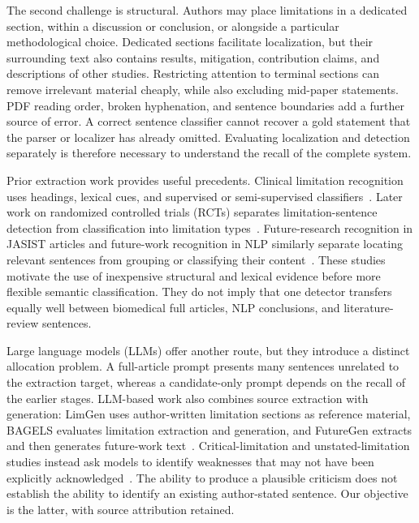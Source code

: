 The second challenge is structural. Authors may place limitations in a dedicated section,
within a discussion or conclusion, or alongside a particular methodological choice. Dedicated
sections facilitate localization, but their surrounding text also contains results, mitigation,
contribution claims, and descriptions of other studies. Restricting attention to terminal
sections can remove irrelevant material cheaply, while also excluding mid-paper statements.
PDF reading order, broken hyphenation, and sentence boundaries add a further source of error.
A correct sentence classifier cannot recover a gold statement that the parser or localizer has
already omitted. Evaluating localization and detection separately is therefore necessary to
understand the recall of the complete system.

Prior extraction work provides useful precedents. Clinical limitation recognition uses headings,
lexical cues, and supervised or semi-supervised classifiers~\citep{kilicoglu2018automatic}.
Later work on randomized controlled trials (RCTs) separates limitation-sentence detection from
classification into limitation types~\citep{lan2024automatic}. Future-research recognition in
JASIST articles and future-work recognition in NLP similarly separate locating relevant sentences
from grouping or classifying their content~\citep{zhu2019recognizing,zhang2023fws}.
These studies motivate the use of inexpensive structural and lexical evidence before more
flexible semantic classification. They do not imply that one detector transfers equally well
between biomedical full articles, NLP conclusions, and literature-review sentences.

Large language models (LLMs) offer another route, but they introduce a distinct allocation problem.
A full-article prompt presents many sentences unrelated to the extraction target, whereas a
candidate-only prompt depends on the recall of the earlier stages. LLM-based work also combines
source extraction with generation: LimGen uses author-written limitation sections as reference
material, BAGELS evaluates limitation extraction and generation, and FutureGen extracts and
then generates future-work text~\citep{faizullah2024limgen,alazher2025bagels,alazher2025futuregen}.
Critical-limitation and unstated-limitation studies instead ask models to identify weaknesses
that may not have been explicitly acknowledged~\citep{xu2025llms,mishra2026tree}.
The ability to produce a plausible criticism does not establish the ability to identify an
existing author-stated sentence. Our objective is the latter, with source attribution retained.

